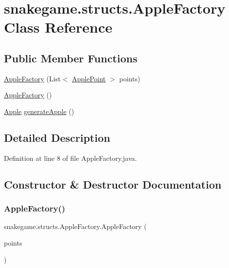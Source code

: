 \hypertarget{classsnakegame_1_1structs_1_1_apple_factory}{}\section{snakegame.\+structs.\+Apple\+Factory Class Reference}
\label{classsnakegame_1_1structs_1_1_apple_factory}
\subsection*{Public Member Functions}
\begin{DoxyCompactItemize}
\item 
\mbox{\hyperlink{classsnakegame_1_1structs_1_1_apple_factory_ac58956184a77beb43d78d6f1a72b3254}{Apple\+Factory}} (List$<$ \mbox{\hyperlink{classsnakegame_1_1structs_1_1_apple_point}{Apple\+Point}} $>$ points)
\item 
\mbox{\hyperlink{classsnakegame_1_1structs_1_1_apple_factory_acc49c3b4cda4250fd4a25181b39cb36e}{Apple\+Factory}} ()
\item 
\mbox{\hyperlink{classsnakegame_1_1structs_1_1_apple}{Apple}} \mbox{\hyperlink{classsnakegame_1_1structs_1_1_apple_factory_a53efb1530e63916af192eb4daa0009f6}{generate\+Apple}} ()
\end{DoxyCompactItemize}


\subsection{Detailed Description}


Definition at line 8 of file Apple\+Factory.\+java.



\subsection{Constructor \& Destructor Documentation}
\mbox{\label{classsnakegame_1_1structs_1_1_apple_factory_ac58956184a77beb43d78d6f1a72b3254}} 
\subsubsection{\texorpdfstring{Apple\+Factory()}{AppleFactory()}\hspace{0.1cm}{\footnotesize\ttfamily [1/2]}}
{\footnotesize\ttfamily snakegame.\+structs.\+Apple\+Factory.\+Apple\+Factory (\begin{DoxyParamCaption}\item[{List$<$ \mbox{\hyperlink{classsnakegame_1_1structs_1_1_apple_point}{Apple\+Point}} $>$}]{points }\end{DoxyParamCaption})}



